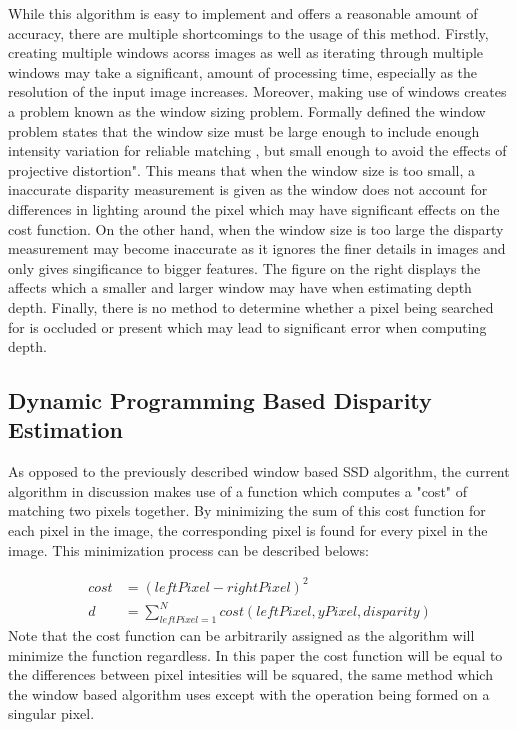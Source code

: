 \documentclass[11pt]{scrartcl}
\begin{document}
While this algorithm is easy to implement and offers a reasonable amount of accuracy, there 
are multiple shortcomings to the usage of this method. Firstly, creating multiple windows 
acorss images as well as iterating through multiple windows may take a significant, 
amount of processing time, especially as the resolution of the input image increases. 
Moreover, making use of windows creates a problem 
known as the window sizing problem. Formally defined the window problem states that 
the window size must be large enough to include enough intensity variation for reliable matching
, but small enough to avoid the effects of projective distortion". This means that when the 
window size is too small, a inaccurate disparity measurement is given as the window does
not account for differences in lighting around the pixel which may have significant effects on the cost function.
On the other hand, when the window size is too large the disparty measurement may become inaccurate as it ignores
the finer details in images and only gives singificance to bigger features. The figure on the right displays the 
affects which a smaller and larger window may have when estimating depth depth. Finally, there is no method to 
determine whether a pixel being searched for is occluded or present which may lead to 
significant error when computing depth. 

\subsection{Dynamic Programming Based Disparity Estimation}
As opposed to the previously described window based SSD algorithm, the current algorithm 
in discussion makes use of a function which computes a "cost" of matching two pixels together. 
By minimizing the sum of this cost function for each pixel in the image, the corresponding pixel 
is found for every pixel in the image. This minimization process can be described belows:

\begin{theorem}
    \begin{align}
        cost & =  (leftPixel - rightPixel)^2 \\
        d & = \displaystyle\sum_{leftPixel=1}^{N} cost(leftPixel,yPixel,disparity)
    \end{align}
    Note that the cost function can be arbitrarily assigned as the algorithm will 
    minimize the function regardless. In this paper the cost function will be equal to the differences between pixel intesities 
    will be squared, the same method which the window based algorithm uses except with the operation being formed 
    on a singular pixel. 
\end{theorem}
\end{document}
